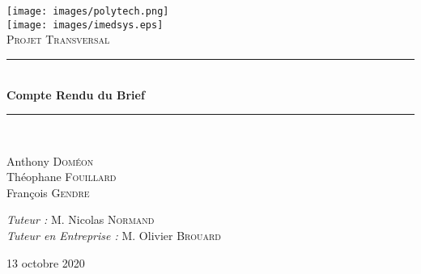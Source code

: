\documentclass[a4paper, 11pt]{report}
\newcommand{\HRule}{\rule{\linewidth}{0.5mm}}
\begin{document}
\begin{titlepage}
  \begin{sffamily}
  \begin{center}

    \texttt{[image: images/polytech.png]}~\\[0.5cm]
    

     \texttt{[image: images/imedsys.eps]}
    \\[2cm]

    \textsc{\Large Projet Transversal}\\[1.5cm]

    \HRule \\[0.4cm]
    { \huge \bfseries Compte Rendu du Brief\\[0.4cm] }

    \HRule \\[2cm]
   

    \begin{minipage}{0.4\textwidth}
      \begin{flushleft} \large
       Anthony \textsc{Doméon}\\
       Théophane \textsc{Fouillard}\\
       François \textsc{Gendre}\\
       
      \end{flushleft}
    \end{minipage}
    \begin{minipage}{0.4\textwidth}
      \begin{flushright} \large
        \emph{Tuteur :} M. Nicolas \textsc{Normand}\\
        \emph{Tuteur en Entreprise : } M. Olivier \textsc{Brouard}
      \end{flushright}
    \end{minipage}

    \vfill

    {\large 13 octobre 2020}

  \end{center}
  \end{sffamily}
\end{titlepage}

\pagestyle{fancy}

\end{document}

